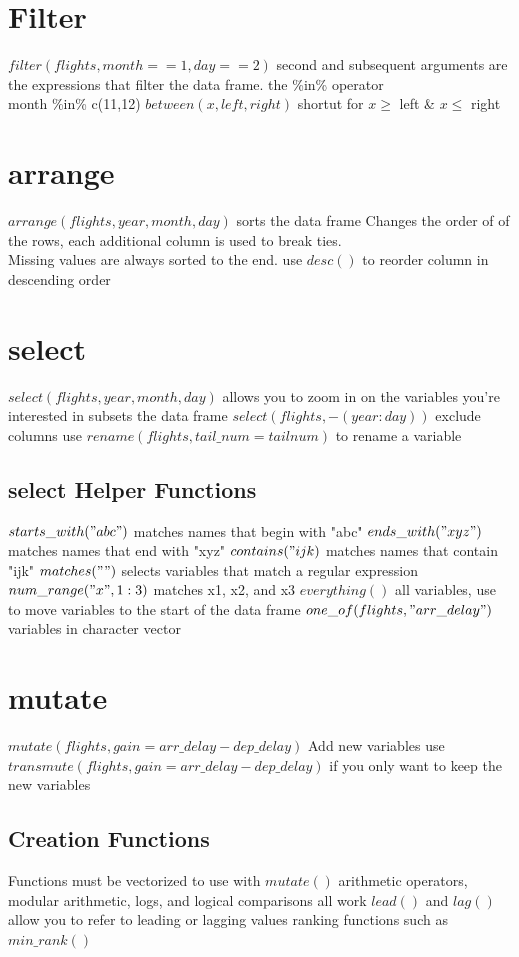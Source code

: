 \documentclass[openany]{book}
\begin{document}
\begin{flushleft}
\section{Filter}
$filter(flights,month==1,day==2)$ \medbreak
second and subsequent arguments are the expressions that filter the data frame.\medbreak
the \%in\% operator\\
month \%in\% c(11,12) \medbreak
$between(x,left,right)$ shortut for $x\geq$ left \& $x\leq$ right
\section{arrange}
$arrange(flights,year,month,day)$\medbreak
sorts the data frame\medbreak
Changes the order of of the rows, each additional column is used to break ties.\\
Missing values are always sorted to the end.\medbreak
use $desc()$ to reorder column in descending order
\section{select}
$select(flights,year,month,day)$\medbreak
allows you to zoom in on the variables you're interested in\medbreak
subsets the data frame \medbreak
$select(flights,-(year:day))$ exclude columns \medbreak
use $rename(flights,tail\_num=tailnum)$ to rename a variable
\subsection{select Helper Functions}
$starts\_with("abc")$ matches names that begin with "abc" \medbreak
$ends\_with("xyz")$ matches names that end with "xyz" \medbreak
$contains("ijk)$ matches names that contain "ijk" \medbreak
$matches("")$ selects variables that match a regular expression \medbreak
$num\_range("x",1:3)$ matches x1, x2, and x3 \medbreak
$everything()$ all variables, use to move variables to the start of the data frame \medbreak
$one\_of(flights,"arr\_delay")$ variables in character vector
\section{mutate}
$mutate(flights,gain=arr\_delay-dep\_delay)$ \medbreak
Add new variables \medbreak
use $transmute(flights,gain=arr\_delay-dep\_delay)$ if you only want to keep the new variables \medbreak
\subsection{Creation Functions}
Functions must be vectorized to use with $mutate()$ \medbreak
arithmetic operators, modular arithmetic, logs, and logical comparisons all work \medbreak
$lead()$ and $lag()$ allow you to refer to leading or lagging values \medbreak
ranking functions such as $min\_rank()$

\end{flushleft}
\end{document}
